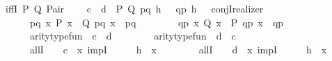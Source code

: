 \begin{isabellebody}
\isanewline
\ \ iffI\ {\isacharparenleft}{\kern0pt}P{\isacharcomma}{\kern0pt}\ Q{\isacharparenright}{\kern0pt}{\isacharcolon}{\kern0pt}\ {\isachardoublequoteopen}Pair{\isachardoublequoteclose}\isanewline
\ \ \ \ {\isachardoublequoteopen}\isactrlbold {\isasymlambda}{\isacharparenleft}{\kern0pt}c{\isacharcolon}{\kern0pt}\ {\isacharunderscore}{\kern0pt}{\isacharparenright}{\kern0pt}\ {\isacharparenleft}{\kern0pt}d{\isacharcolon}{\kern0pt}\ {\isacharunderscore}{\kern0pt}{\isacharparenright}{\kern0pt}\ P\ Q\ pq\ {\isacharparenleft}{\kern0pt}h{}\ {\isacharcolon}{\kern0pt}\ {\isacharunderscore}{\kern0pt}{\isacharparenright}{\kern0pt}\ qp\ {\isacharparenleft}{\kern0pt}h{}\ {\isacharcolon}{\kern0pt}\ {\isacharunderscore}{\kern0pt}{\isacharparenright}{\kern0pt}{\isachardot}{\kern0pt}\ conjI{\isacharunderscore}{\kern0pt}realizer\ {\isasymcdot}\isanewline
\ \ \ \ \ \ \ {\isacharparenleft}{\kern0pt}{\isasymlambda}pq{\isachardot}{\kern0pt}\ {\isasymforall}x{\isachardot}{\kern0pt}\ P\ x\ {\isasymlongrightarrow}\ Q\ {\isacharparenleft}{\kern0pt}pq\ x{\isacharparenright}{\kern0pt}{\isacharparenright}{\kern0pt}\ {\isasymcdot}\ pq\ {\isasymcdot}\isanewline
\ \ \ \ \ \ \ {\isacharparenleft}{\kern0pt}{\isasymlambda}qp{\isachardot}{\kern0pt}\ {\isasymforall}x{\isachardot}{\kern0pt}\ Q\ x\ {\isasymlongrightarrow}\ P\ {\isacharparenleft}{\kern0pt}qp\ x{\isacharparenright}{\kern0pt}{\isacharparenright}{\kern0pt}\ {\isasymcdot}\ qp\ {\isasymbullet}\isanewline
\ \ \ \ \ \ \ {\isacharparenleft}{\kern0pt}arity{\isacharunderscore}{\kern0pt}type{\isacharunderscore}{\kern0pt}fun\ {\isasymbullet}\ c\ {\isasymbullet}\ d{\isacharparenright}{\kern0pt}\ {\isasymbullet}\isanewline
\ \ \ \ \ \ \ {\isacharparenleft}{\kern0pt}arity{\isacharunderscore}{\kern0pt}type{\isacharunderscore}{\kern0pt}fun\ {\isasymbullet}\ d\ {\isasymbullet}\ c{\isacharparenright}{\kern0pt}\ {\isasymbullet}\isanewline
\ \ \ \ \ \ \ {\isacharparenleft}{\kern0pt}allI\ {\isasymcdot}\ {\isacharunderscore}{\kern0pt}\ {\isasymbullet}\ c\ {\isasymbullet}\ {\isacharparenleft}{\kern0pt}\isactrlbold {\isasymlambda}x{\isachardot}{\kern0pt}\ impI\ {\isasymcdot}\ {\isacharunderscore}{\kern0pt}\ {\isasymcdot}\ {\isacharunderscore}{\kern0pt}\ {\isasymbullet}\ {\isacharparenleft}{\kern0pt}h{}\ {\isasymcdot}\ x{\isacharparenright}{\kern0pt}{\isacharparenright}{\kern0pt}{\isacharparenright}{\kern0pt}\ {\isasymbullet}\isanewline
\ \ \ \ \ \ \ {\isacharparenleft}{\kern0pt}allI\ {\isasymcdot}\ {\isacharunderscore}{\kern0pt}\ {\isasymbullet}\ d\ {\isasymbullet}\ {\isacharparenleft}{\kern0pt}\isactrlbold {\isasymlambda}x{\isachardot}{\kern0pt}\ impI\ {\isasymcdot}\ {\isacharunderscore}{\kern0pt}\ {\isasymcdot}\ {\isacharunderscore}{\kern0pt}\ {\isasymbullet}\ {\isacharparenleft}{\kern0pt}h{}\ {\isasymcdot}\ x{\isacharparenright}{\kern0pt}{\isacharparenright}{\kern0pt}{\isacharparenright}{\kern0pt}{\isachardoublequoteclose}\isanewline

\end{isabellebody}
